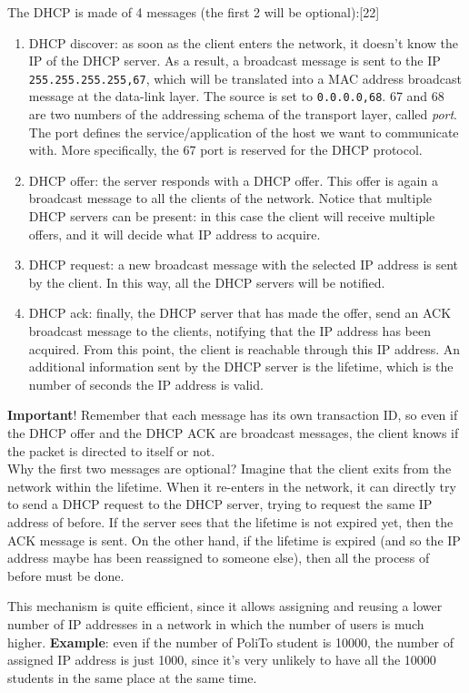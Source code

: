 \noindent The DHCP is made of 4 messages (the first 2 will be optional):[22]
\begin{enumerate}
    \item DHCP discover: as soon as the client enters the network, it doesn't know the IP of the DHCP server. As a result, a broadcast message is sent to the IP \texttt{255.255.255.255,67}, which will be translated into a MAC address broadcast message at the data-link layer. The source is set to \texttt{0.0.0.0,68}. 67 and 68 are two numbers of the addressing schema of the transport layer, called \textit{port}. The port defines the service/application of the host we want to communicate with. More specifically, the 67 port is reserved for the DHCP protocol.
    \item DHCP offer: the server responds with a DHCP offer. This offer is again a broadcast message to all the clients of the network. Notice that multiple DHCP servers can be present: in this case the client will receive multiple offers, and it will decide what IP address to acquire.
    \item DHCP request: a new broadcast message with the selected IP address is sent by the client. In this way, all the DHCP servers will be notified. 
    \item DHCP ack: finally, the DHCP server that has made the offer, send an ACK broadcast message to the clients, notifying that the IP address has been acquired. From this point, the client is reachable through this IP address. An additional information sent by the DHCP server is the lifetime, which is the number of seconds the IP address is valid.
\end{enumerate}

\noindent \textbf{Important}! Remember that each message has its own transaction ID, so even if the DHCP offer and the DHCP ACK are broadcast messages, the client knows if the packet is directed to itself or not.\\

\noindent Why the first two messages are optional?
Imagine that the client exits from the network within the lifetime. When it re-enters in the network, it can directly try to send a DHCP request to the DHCP server, trying to request the same IP address of before. If the server sees that the lifetime is not expired yet, then the ACK message is sent. On the other hand, if the lifetime is expired (and so the IP address maybe has been reassigned to someone else), then all the process of before must be done.

This mechanism is quite efficient, since it allows assigning and reusing a lower number of IP addresses in a network in which the number of users is much higher. \textbf{Example}: even if the number of PoliTo student is 10000, the number of assigned IP address is just 1000, since it's very unlikely to have all the 10000 students in the same place at the same time.

